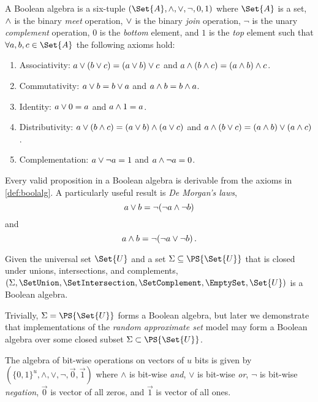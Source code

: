 \documentclass[../main.tex]{subfiles}
\begin{document}
\begin{definition}
\label{def:boolalg}
A Boolean algebra is a six-tuple $(\Set{A},\meet,\join,\neg,0,1)$ where 
$\Set{A}$ is a set, $\land$ is the
binary \emph{meet} operation, $\lor$ is the binary \emph{join} operation, 
$\neg$ is the unary \emph{complement} operation, $0$ is the \emph{bottom} 
element, and $1$ is the \emph{top} element such that $\forall a,b,c \in 
\Set{A}$ the following axioms hold:
\begin{enumerate}
\item Associativity: $a \lor (b \lor c) = (a \lor b) \lor c$ and $a \land 
(b \land c) = (a \land b) \land c$.	
\item Commutativity: $a \lor b = b \lor a$ and $a \land b = b \land a$.
\item Identity: $a \lor 0 = a$ and $a \land 1 = a$.
\item Distributivity: $a \lor (b \land c) = (a \lor b) \land (a \lor c)$ 
and $a \land (b \lor c) = (a \land b) \lor (a \land c)$.
\item Complementation: $a \lor \neg a = 1$ and $a \land \neg a= 0$.
\end{enumerate}
\end{definition}
Every valid proposition in a Boolean algebra is derivable from the axioms in 
\cref{def:boolalg}. A particularly useful result is \emph{De Morgan's laws},
\begin{equation}
a \lor b = \neg (\neg a \land \neg b)
\end{equation}
and
\begin{equation}
a \land b = \neg (\neg a \lor \neg b)\,.
\end{equation}

\begin{postulate}
Given the universal set $\Set{U}$ and a set $\Sigma \subseteq \PS{\Set{U}}$ that is closed under unions, intersections, and complements, $(\Sigma,\SetUnion,\SetIntersection,\SetComplement,\EmptySet,\Set{U})$ is a Boolean algebra.
\end{postulate}
Trivially, $\Sigma = \PS{\Set{U}}$ forms a Boolean algebra, but later we demonstrate that implementations of the \emph{random approximate set} model may form a Boolean algebra over some closed subset $\Sigma \subset \PS{\Set{U}}$.

The algebra of bit-wise operations on vectors of $u$ bits is given by $(\{0,1\}^u,\land,\lor,\neg,\vec{0},\vec{1})$ where $\land$ is bit-wise \emph{and}, $\lor$ is bit-wise \emph{or}, $\neg$ is bit-wise \emph{negation}, $\vec{0}$ is vector of all zeros, and $\vec{1}$ is vector of all ones.
\end{document}

